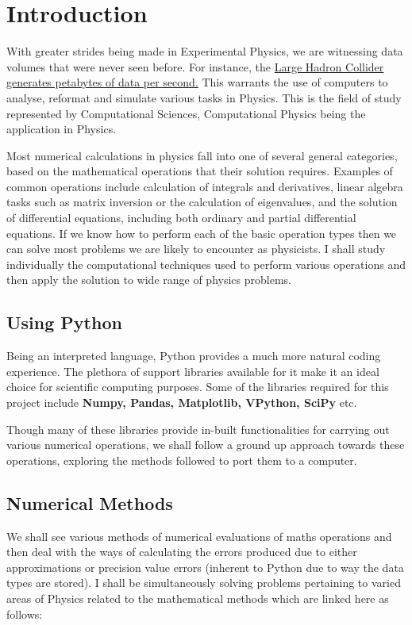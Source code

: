 \section{Introduction}
	\par With greater strides being made in Experimental Physics, we are witnessing data volumes that were never seen before. For instance, the \href{https://home.cern/news/news/computing/cern-data-centre-passes-200-petabyte-milestone}{Large Hadron Collider generates petabytes of data per second.} This warrants the use of computers to analyse, reformat and simulate various tasks in Physics. This is the field of study represented by Computational Sciences, Computational Physics being the application in Physics.\medskip
	\par Most numerical calculations in physics fall into one of several general categories, based on the mathematical operations that their solution requires. Examples of common operations include calculation of integrals and derivatives, linear algebra tasks such as matrix inversion or the calculation of eigenvalues, and the solution of differential equations, including both ordinary and partial differential equations. 
     If we know how to perform each of the basic operation types then we can solve most problems we are likely to encounter as physicists. I shall study individually the computational techniques used to perform various operations and then apply the solution to wide range of physics problems.
\subsection{Using Python}
Being an interpreted language, Python provides a much more natural coding experience. The plethora of support libraries available for it make it an ideal choice for scientific computing purposes. Some of the libraries required for this project include \textbf{Numpy, Pandas, Matplotlib, VPython, SciPy} etc. 
	\par Though many of these libraries provide in-built functionalities for carrying out various numerical operations, we shall follow a ground up approach towards these operations, exploring the methods followed to port them to a computer.
\subsection{Numerical Methods}
We shall see various methods of numerical evaluations of maths operations and then deal with the ways of calculating the errors produced due to either approximations or precision value errors (inherent to Python due to way the data types are stored). I shall be simultaneously solving problems pertaining to varied areas of Physics related to the mathematical methods which are linked here as follows:
 
